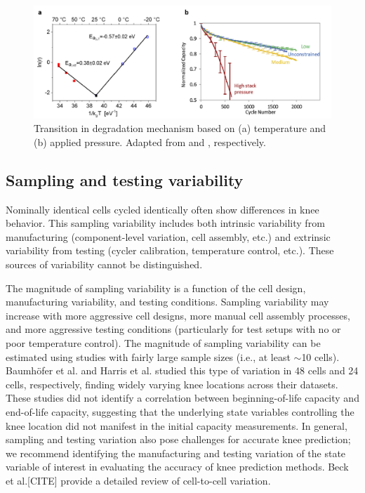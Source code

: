 \documentclass{article}
\begin{document}
\begin{figure}[ht]
\centering
\includegraphics[scale = 0.7]{images/Temperature_and_pressure.png}
\caption{Transition in degradation mechanism based on (a) temperature and (b) applied pressure. Adapted from \cite{waldmann_temperature_2014} and \cite{cannarella_stress_2014}, respectively.}
\label{fig:temperature_and_pressure}
\end{figure}



\subsection{Sampling and testing variability}

Nominally identical cells cycled identically often show differences in knee behavior. This sampling variability includes both intrinsic variability from manufacturing (component-level variation, cell assembly, etc.) and extrinsic variability from testing (cycler calibration, temperature control, etc.). These sources of variability cannot be distinguished.

The magnitude of sampling variability is a function of the cell design, manufacturing variability, and testing conditions. Sampling variability may increase with more aggressive cell designs, more manual cell assembly processes, and more aggressive testing conditions (particularly for test setups with no or poor temperature control). The magnitude of sampling variability can be estimated using studies with fairly large sample sizes (i.e., at least $\sim$10 cells). Baumhöfer et al.\cite{baumhofer_production_2014} and Harris et al.\cite{harris_failure_2017} studied this type of variation in 48 cells and 24 cells, respectively, finding widely varying knee locations across their datasets. These studies did not identify a correlation between beginning-of-life capacity and end-of-life capacity, suggesting that the underlying state variables controlling the knee location did not manifest in the initial capacity measurements. In general, sampling and testing variation also pose challenges for accurate knee prediction; we recommend identifying the manufacturing and testing variation of the state variable of interest in evaluating the accuracy of knee prediction methods. Beck et al.[CITE] provide a detailed review of cell-to-cell variation.
\end{document}
